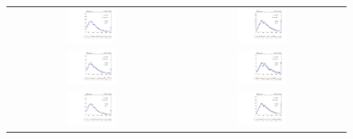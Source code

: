 \begin{figure}[htb]
  \begin{center}
    \begin{tabular}{cc}
      \includegraphics[width=0.3\textwidth]{bkgd/figs/plot_results_mll_MCClosure_central_onlyTT_nbInc.pdf} &
      \includegraphics[width=0.3\textwidth]{bkgd/figs/plot_results_mll_MCClosure_forward_onlyTT_nbInc.pdf}\\
      \includegraphics[width=0.3\textwidth]{bkgd/figs/plot_results_mll_MCClosure_central_onlyTT_nb0.pdf} &
      \includegraphics[width=0.3\textwidth]{bkgd/figs/plot_results_mll_MCClosure_forward_onlyTT_nb0.pdf} \\
      \includegraphics[width=0.3\textwidth]{bkgd/figs/plot_results_mll_MCClosure_central_onlyTT_nb1.pdf} &
      \includegraphics[width=0.3\textwidth]{bkgd/figs/plot_results_mll_MCClosure_forward_onlyTT_nb1.pdf}\\

\end{tabular}
\end{center}
\end{figure}
